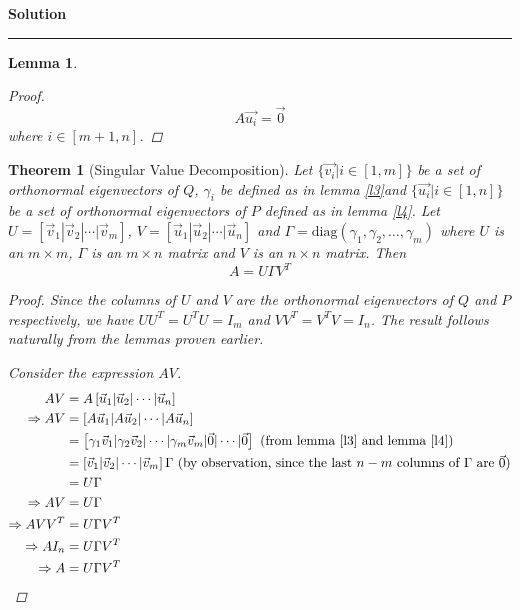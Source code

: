 \documentclass[a4paper,12pt]{article}
\newenvironment{solution}[2][]{%
    \begin{mdframed}[linecolor=blue!70!black, linewidth=2pt, roundcorner=10pt, backgroundcolor=yellow!10!white, skipabove=12pt, skipbelow=12pt]%
        \textbf{\large #2}
        \par\noindent\rule{\textwidth}{0.4pt}
}{
    \end{mdframed}
}
\newtheorem{lemma}{Lemma}
\newtheorem{theorem}{Theorem}
\begin{document}
\begin{solution}{Solution}
\begin{lemma}
\begin{proof}
                  \[A\vec{u_{i}} = \vec{0}\]
              where $i \in [m + 1,n]$.
          \end{proof}
        \end{lemma}
        \begin{theorem}[Singular Value Decomposition]\label{svd}
            Let $\{\vec{v_{i}} | i \in [1,m]\}$ be a set of orthonormal eigenvectors of $Q$, $\gamma_{i}$ be 
            defined as in lemma \@\ref{l3}and $\{\vec{u_{i}} | i \in [1,n]\}$ be a set of orthonormal eigenvectors of 
            $P$ defined as in lemma \@\ref{l4}.
            Let $U = \left[\vec{v}_{1} | \vec{v}_{2} | \cdots | \vec{v}_{m}\right]$,
            $V = \left[\vec{u}_{1} | \vec{u}_{2} | \cdots | \vec{u}_{n}\right]$ and 
            $\Gamma =\text{diag}(\gamma_{1},\gamma_{2},\dots,\gamma_{m})$ where $U$ is an $m \times m$, $\Gamma$ is an 
            $m \times n$ matrix and $V$ is an $n \times n$ matrix. Then \[ A = U \Gamma V^{T} \]
            \begin{proof}
              Since the columns of $U$ and $V$ are the orthonormal eigenvectors of $Q$ and $P$ respectively, we have 
              $UU^{T} = U^{T}U = I_{m}$ and $VV^{T} = V^{T}V = I_{n}$. The result follows naturally from the lemmas proven earlier.
              
              Consider the expression $AV$.
              \begin{align}
                AV &= A \left[ \vec{u}_{1} | \vec{u}_{2} | \cdots | \vec{u}_{n}\right] \nonumber \\
                \Rightarrow AV &= \left[ A\vec{u}_{1} | A\vec{u}_{2} | \cdots | A \vec{u}_{n} \right] \nonumber \\
                               &= \left[ \gamma_{1}\vec{v}_{1} | \gamma_{2}\vec{v}_{2} | \cdots | \gamma_{m} \vec{v}_{m} | 
                               \vec{0} | \cdots |\vec{0}\right] \text{ (from lemma \@\ref{l3} and lemma \@\ref{l4})} \nonumber \\
                               &= \left[\vec{v}_{1} | \vec{v}_{2} | \cdots | \vec{v}_{m}\right] \Gamma \text{ (by observation, since the last $n - m$ columns of $\Gamma$ are $\vec{0}$)}\nonumber \\
                               &= U \Gamma \nonumber \\
                \Rightarrow AV &= U \Gamma \nonumber \\
                \Rightarrow A V V^{T} &= U \Gamma V^{T} \nonumber \\
                \Rightarrow A I_{n} &= U \Gamma V^{T} \nonumber \\
                \Rightarrow A &=  U \Gamma V^{T}
              \end{align}
               

\end{proof}
\end{theorem}
\end{solution}
\end{document}
